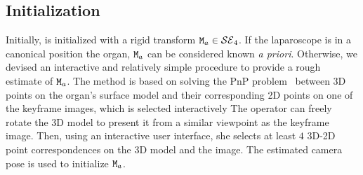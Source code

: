 








\subsection{Initialization}
\label{sec:Initialization}
Initially, \xref is initialized with a rigid transform $\mat{M}_a\in \mathcal{SE}_4$.
If the laparoscope is in a canonical position \wrt the organ, $\mat{M}_a$ can be considered known \emph{a priori}.
Otherwise, we devised an interactive and relatively simple procedure to provide a rough estimate of $\mat{M}_a$.
The method is based on solving the PnP problem~\cite{Lepetit2009Epnp} between 3D points on the organ's surface model and their corresponding 2D points on one of the keyframe images, which is selected interactively
The operator can freely rotate the 3D model to present it from a similar viewpoint as the keyframe image.
Then, using an interactive user interface, she selects at least $4$ 3D-2D point correspondences on the 3D model and the image.
The estimated camera pose is used to initialize  $\mat{M}_a$.

